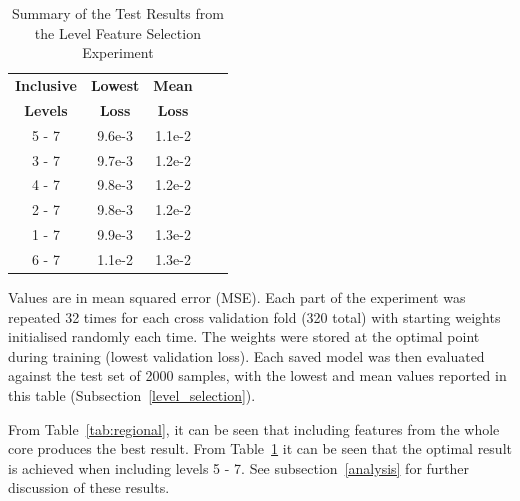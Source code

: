 \begin{table}[h!]
	\begin{center}
		
		\begin{tabular}{c|c|c|r|c} %
			\textbf{Inclusive} & \textbf{Lowest} & \textbf{Mean} \\
			
			\textbf{Levels} & \textbf{Loss} & \textbf{Loss} \\
			\hline
			5 - 7 & 9.6e-3 & 1.1e-2 \\
			3 - 7 & 9.7e-3 & 1.2e-2 \\
			4 - 7 & 9.8e-3 & 1.2e-2 \\
			2 - 7 & 9.8e-3 & 1.2e-2 \\
			1 - 7 & 9.9e-3 & 1.3e-2 \\
			6 - 7 & 1.1e-2 & 1.3e-2 \\
		\end{tabular}
		\caption{Summary of the Test Results from the Level Feature Selection Experiment} { Values are in mean squared error (MSE). Each part of the experiment was repeated 32 times for each cross validation fold (320 total) with starting weights initialised randomly each time. The weights were stored at the optimal point during training (lowest validation loss). Each saved model was then evaluated against the test set of 2000 samples, with the lowest and mean values reported in this table (Subsection~\ref{level_selection}).}
		\label{tab:levels}
	\end{center}
\end{table}

\noindent
From Table~\ref{tab:regional}, it can be seen that including features from the whole core produces the best result. From Table~\ref{tab:levels} it can be seen that the optimal result is achieved when including levels 5 - 7. See subsection~\ref{analysis} for further discussion of these results.

